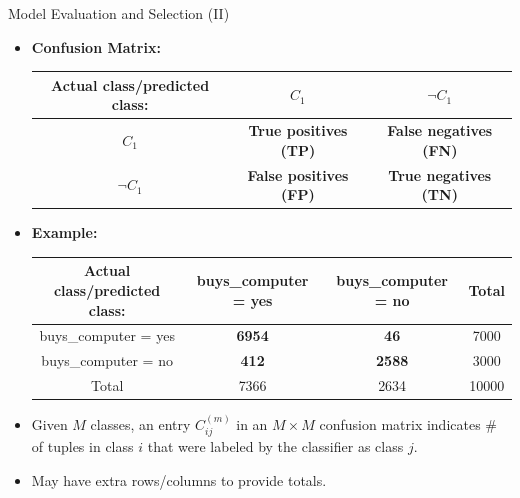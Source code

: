 \begin{frame}{Model Evaluation and Selection (II)}
	\begin{itemize}
		\item \textbf{Confusion Matrix:}\\[0.2cm]
		      \begin{tabular}{|c|c|c|}
			      \hline
			      Actual class/predicted class: & $C_1$                         & $\neg C_1$                    \\\hline
			      $C_1$                         & \textbf{True positives (TP)}  & \textbf{False negatives (FN)} \\\hline
			      $\neg C_1$                    & \textbf{False positives (FP)} & \textbf{True negatives (TN)}  \\\hline
		      \end{tabular}
		\item \textbf{Example:}\\[0.2cm]
		      \begin{tabular}{|c|c|c|c|}
			      \hline
			      Actual class/predicted class: & buys\_computer = yes & buys\_computer = no & Total \\\hline
			      buys\_computer = yes          & \textbf{6954}        & \textbf{46}         & 7000  \\\hline
			      buys\_computer = no           & \textbf{412}         & \textbf{2588}       & 3000  \\\hline
			      Total                         & 7366                 & 2634                & 10000 \\\hline
		      \end{tabular}
		\item Given $M$ classes, an entry $C^{(m)}_{ij}$ in an $M \times M$ confusion matrix indicates \# of tuples in class $i$ that were labeled by the classifier as class $j$.
		\item May have extra rows/columns to provide totals.
	\end{itemize}
\end{frame}

